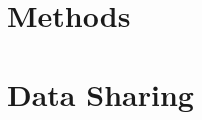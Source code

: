 \documentclass[onecolumn, compsoc,10pt]{IEEEtran}
\begin{document}







\section*{Methods}






\section*{Data Sharing} 
\end{document}
